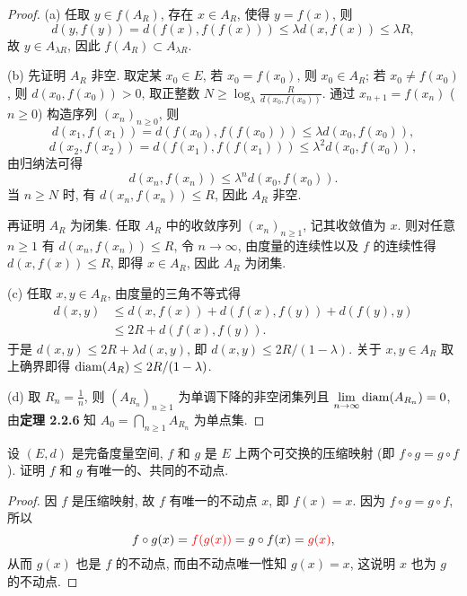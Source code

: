 \begin{proof}
    (a) 任取 $y\in f(A_R)$, 存在 $x\in A_R$, 使得 $y=f(x)$, 则
    \[d(y,f(y))=d(f(x),f(f(x)))\leq\lambda d(x,f(x))\leq\lambda R,\]
    故 $y\in  A_{\lambda R}$, 因此 $f(A_R)\subset A_{\lambda R}$.

    (b) 先证明 $A_R$ 非空. 取定某 $x_0\in E$, 若 $x_0=f(x_0)$, 则 $x_0\in A_R$;
    若 $x_0\neq f(x_0)$, 则 $d(x_0,f(x_0))>0$, 取正整数 $N\geq\log_{\lambda}\frac{R}{d(x_0,f(x_0))}$.
    通过 $x_{n+1}=f(x_n)$ ($n\geq 0$) 构造序列 $(x_n)_{n\geq 0}$, 则
    \[d(x_1,f(x_1))=d(f(x_0),f(f(x_0)))\leq\lambda d(x_0,f(x_0)),\]
    \[d(x_2,f(x_2))=d(f(x_1),f(f(x_1)))\leq\lambda^2 d(x_0,f(x_0)),\]
    由归纳法可得
    \[d(x_n,f(x_n))\leq\lambda^n d(x_0,f(x_0)).\]
    当 $n\geq N$ 时, 有 $d(x_n,f(x_n))\leq R$, 因此 $A_R$ 非空.

    再证明 $A_R$ 为闭集. 任取 $A_R$ 中的收敛序列 $(x_n)_{n\geq 1}$,
    记其收敛值为 $x$. 则对任意 $n\geq 1$ 有 $d(x_n,f(x_n))\leq R$,
    令 $n\to\infty$, 由度量的连续性以及 $f$ 的连续性得 $d(x,f(x))\leq R$,
    即得 $x\in A_R$, 因此 $A_R$ 为闭集.

    (c) 任取 $x,y\in A_R$, 由度量的三角不等式得
    \begin{align*}
        d(x,y)
        &\leq d(x,f(x))+d(f(x),f(y))+d(f(y),y) \\
        &\leq 2R+d(f(x),f(y)).
    \end{align*}
    于是 $d(x,y)\leq 2R+\lambda d(x,y)$, 即 $d(x,y)\leq 2R/(1-\lambda)$.
    关于 $x,y\in A_R$ 取上确界即得 $\operatorname{diam}(A_R)\leq 2R/(1-\lambda)$.

    (d) 取 $R_n=\frac{1}{n}$, 则 $(A_{R_n})_{n\geq 1}$ 为单调下降的非空闭集列且
    $\lim\limits_{n\to\infty}\operatorname{diam}(A_{R_n})=0$, 由\textbf{定理 2.2.6} 知 $A_0=\bigcap\limits_{n\geq 1}A_{R_n}$
    为单点集.
\end{proof}



\begin{exercise}
    设 $(E,d)$ 是完备度量空间, $f$ 和 $g$ 是 $E$ 上两个可交换的压缩映射 (即 $f\circ g=g\circ f$).
    证明 $f$ 和 $g$ 有唯一的、共同的不动点.
\end{exercise}

\begin{proof}
    因 $f$ 是压缩映射, 故 $f$ 有唯一的不动点 $x$, 即 $f(x)=x$.
    因为 $f\circ g=g\circ f$, 所以
    \[f\circ g(x)=\textcolor{red}{f(g(x))}=g\circ f(x)=\textcolor{red}{g(x)},\]
    从而 $g(x)$ 也是 $f$ 的不动点, 而由不动点唯一性知 $g(x)=x$,
    这说明 $x$ 也为 $g$ 的不动点.
\end{proof}



